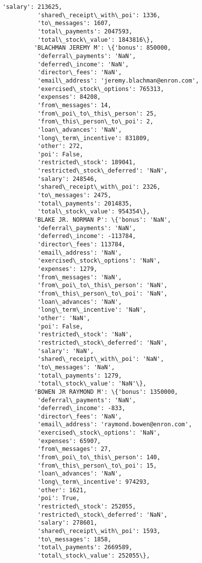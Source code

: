 \documentclass[11pt]{article}
\begin{document}
\begin{Verbatim}[commandchars=\\\{\}]
          'salary': 213625,
          'shared\_receipt\_with\_poi': 1336,
          'to\_messages': 1607,
          'total\_payments': 2047593,
          'total\_stock\_value': 1843816\},
         'BLACHMAN JEREMY M': \{'bonus': 850000,
          'deferral\_payments': 'NaN',
          'deferred\_income': 'NaN',
          'director\_fees': 'NaN',
          'email\_address': 'jeremy.blachman@enron.com',
          'exercised\_stock\_options': 765313,
          'expenses': 84208,
          'from\_messages': 14,
          'from\_poi\_to\_this\_person': 25,
          'from\_this\_person\_to\_poi': 2,
          'loan\_advances': 'NaN',
          'long\_term\_incentive': 831809,
          'other': 272,
          'poi': False,
          'restricted\_stock': 189041,
          'restricted\_stock\_deferred': 'NaN',
          'salary': 248546,
          'shared\_receipt\_with\_poi': 2326,
          'to\_messages': 2475,
          'total\_payments': 2014835,
          'total\_stock\_value': 954354\},
         'BLAKE JR. NORMAN P': \{'bonus': 'NaN',
          'deferral\_payments': 'NaN',
          'deferred\_income': -113784,
          'director\_fees': 113784,
          'email\_address': 'NaN',
          'exercised\_stock\_options': 'NaN',
          'expenses': 1279,
          'from\_messages': 'NaN',
          'from\_poi\_to\_this\_person': 'NaN',
          'from\_this\_person\_to\_poi': 'NaN',
          'loan\_advances': 'NaN',
          'long\_term\_incentive': 'NaN',
          'other': 'NaN',
          'poi': False,
          'restricted\_stock': 'NaN',
          'restricted\_stock\_deferred': 'NaN',
          'salary': 'NaN',
          'shared\_receipt\_with\_poi': 'NaN',
          'to\_messages': 'NaN',
          'total\_payments': 1279,
          'total\_stock\_value': 'NaN'\},
         'BOWEN JR RAYMOND M': \{'bonus': 1350000,
          'deferral\_payments': 'NaN',
          'deferred\_income': -833,
          'director\_fees': 'NaN',
          'email\_address': 'raymond.bowen@enron.com',
          'exercised\_stock\_options': 'NaN',
          'expenses': 65907,
          'from\_messages': 27,
          'from\_poi\_to\_this\_person': 140,
          'from\_this\_person\_to\_poi': 15,
          'loan\_advances': 'NaN',
          'long\_term\_incentive': 974293,
          'other': 1621,
          'poi': True,
          'restricted\_stock': 252055,
          'restricted\_stock\_deferred': 'NaN',
          'salary': 278601,
          'shared\_receipt\_with\_poi': 1593,
          'to\_messages': 1858,
          'total\_payments': 2669589,
          'total\_stock\_value': 252055\},

\end{Verbatim}
\end{document}
